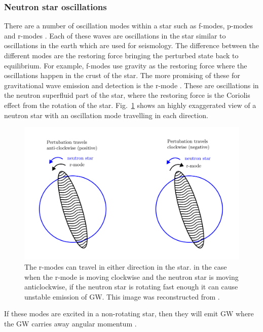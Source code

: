  \subsubsection{Neutron star oscillations}
There are a number of oscillation modes within a star such as f-modes, p-modes and r-modes \citep{becker2009NeutronStars}. 
Each of these waves are oscillations in the star similar to oscillations in the earth which are used for seismology.
The difference between the different modes are the restoring force bringing the perturbed state back to equilibrium.
For example, f-modes use gravity as the restoring force where the oscillations happen in the crust of the star.
The more promising of these for gravitational wave emission and detection is the r-mode \citep{lasky2015GravitationalWaves}. 
These are oscillations in the neutron superfluid part of the star, where the restoring force is the Coriolis effect from the rotation of the star.
Fig.~\ref{intro:source:cw:rmode} shows an highly exaggerated view of a neutron star with an oscillation mode travelling in each direction.
\begin{figure}[h]
	\centering
	\includegraphics[width=\textwidth]{C1_intro/rmode.pdf}
	\caption[Generating \glspl{GW} from r-modes in neutron stars.]{The r-modes can travel in either direction in the star. in the case when the r-mode is moving clockwise and the neutron star is moving anticlockwise, if the neutron star is rotating fast enough it can cause unstable emission of \gls{GW}. This image was reconstructed from \citep{jonesCFSInstability}.}
	\label{intro:source:cw:rmode}
\end{figure}
If these modes are excited in a non-rotating star, then they will emit \gls{GW} where the \gls{GW}  carries away angular momentum \citep{jonesCFSInstability}. 
